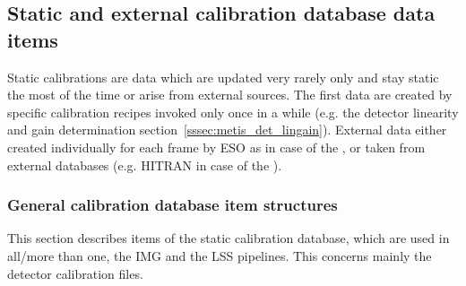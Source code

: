 
\subsection{Static and external calibration database data items}\label{ssec:caldb_items_structures}
Static calibrations are data which are updated very rarely only and stay static the most of the time or arise from external sources. The first data are created by specific calibration recipes invoked only once in a while (e.g. the detector linearity and gain determination section~\ref{sssec:metis_det_lingain}). External data either created individually for each frame by \ac{ESO} as in case of the , or taken from external databases (e.g. \ac{HITRAN} in case of the ).

\subsubsection{General calibration database item structures}\label{sssec:generalcaldbdatastructs}
This section describes items of the static calibration database, which are used in all/more than one, the \ac{IMG} and the \ac{LSS} pipelines. This concerns mainly the detector calibration files.


